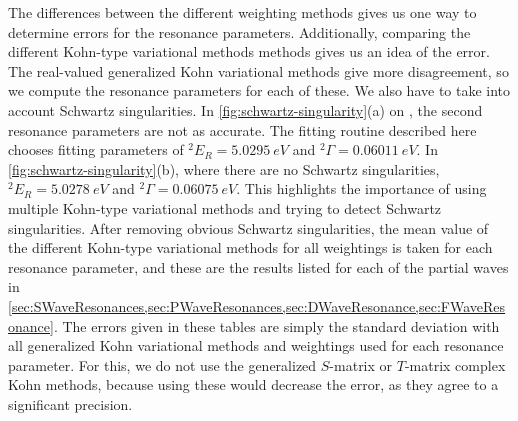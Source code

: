 \documentclass[Dissertation.tex]{subfiles}
\begin{document}
The differences between the different weighting methods gives us one way to 
determine errors for the resonance parameters. Additionally, comparing the 
different Kohn-type variational methods methods gives us an idea of the error. The real-valued 
generalized Kohn variational methods give more disagreement, so we compute the resonance 
parameters for each of these. We also have to take into account 
Schwartz singularities. In \cref{fig:schwartz-singularity}(a) on
\pageref{fig:schwartz-singularity}, the second resonance parameters are not as 
accurate. The fitting routine described here chooses fitting parameters of
$^2E_R = \SI{5.0295}{eV}$ and $^2\Gamma = \SI{0.06011}{eV}$.
In \cref{fig:schwartz-singularity}(b), where there are no Schwartz 
singularities, $^2E_R = \SI{5.0278}{eV}$ and $^2\Gamma = \SI{0.06075}{eV}$. 
This highlights the importance of using multiple Kohn-type variational methods and trying to 
detect Schwartz singularities. After removing obvious Schwartz singularities, 
the mean value of the different Kohn-type variational methods for all weightings is taken for 
each resonance parameter, and these are the results listed for each of the 
partial waves in
\cref{sec:SWaveResonances,sec:PWaveResonances,sec:DWaveResonance,sec:FWaveResonance}.
The errors given in these tables are simply the standard deviation with all 
generalized Kohn variational methods and weightings used for each resonance parameter. For this, we 
do not use the generalized $S$-matrix or $T$-matrix complex Kohn methods,
because using these would decrease the error, as they agree to a significant
precision.



\biblio
\end{document}
